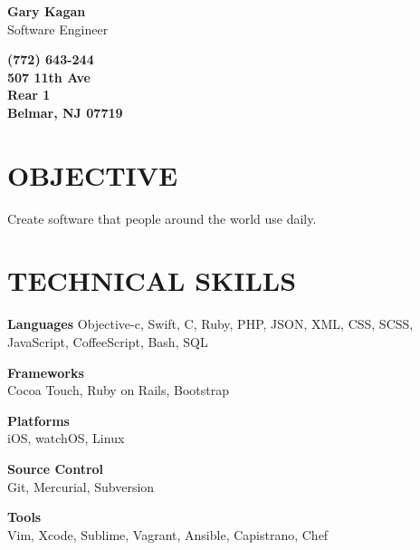 \documentclass{res}
\begin{document}
 

\begin{multicols}{2}
\begin{flushleft}
\textbf{Gary Kagan}\\
Software Engineer
\end{flushleft}
\columnbreak
\begin{flushright}
\textbf{(772) 643-244\\[0.3em]507 11th Ave\\Rear 1\\Belmar, NJ 07719}
\end{flushright}
\end{multicols}


\begin{resume}
\section{OBJECTIVE}          
    Create software that people around the world use daily.

\section{TECHNICAL SKILLS}
    \textbf{Languages}
    Objective-c, Swift, C, Ruby, PHP, JSON, XML, CSS, SCSS, JavaScript, CoffeeScript, Bash, SQL

    \begin{multicols}{2}
    \begin{flushleft}
    \textbf{Frameworks}\\
    Cocoa Touch, Ruby on Rails, Bootstrap
    \end{flushleft}
    \columnbreak
    \textbf{Platforms}\\
    iOS, watchOS, Linux
    \end{multicols}

    \begin{multicols}{2}
    \begin{flushleft}
    \textbf{Source Control}\\
    Git, Mercurial, Subversion
    \end{flushleft}
    \columnbreak
    \textbf{Tools}\\
    Vim, Xcode, Sublime, Vagrant, Ansible, Capistrano, Chef
    \end{multicols}



\end{resume}
\end{document}
